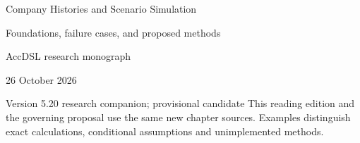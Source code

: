 \documentclass[11pt,a4paper]{report}
\begin{document}
\hypersetup{pageanchor=false}
\begin{titlepage}
{\Huge Company Histories and Scenario Simulation\par}
\vspace{12mm}
{\Large Foundations, failure cases, and proposed methods\par}
\vspace{8mm}
AccDSL research monograph\par 26 October 2026\par Version 5.20 research companion; provisional candidate
\vfill
This reading edition and the governing proposal use the same new chapter sources. Examples distinguish exact calculations, conditional assumptions and unimplemented methods.
\end{titlepage}
\hypersetup{pageanchor=true}
\tableofcontents
\clearpage{}


























\clearpage\label{sim:body-end}

\begingroup\raggedright
\endgroup
\end{document}
